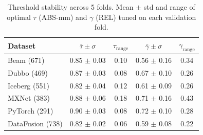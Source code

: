\begin{table}[t]
\centering
\caption{Threshold stability across 5 folds. Mean $\pm$ std and range of optimal $\tau$ (ABS-mm) and $\gamma$ (REL) tuned on each validation fold.}
\label{tab:threshold_stability}
\begin{tabular}{lcccc}
\toprule
Dataset & $\bar{\tau} \pm \sigma$ & $\tau_{\text{range}}$ & $\bar{\gamma} \pm \sigma$ & $\gamma_{\text{range}}$ \\
\midrule
  Beam (671)                & 0.85 $\pm$ 0.03 & 0.10 & 0.56 $\pm$ 0.16 & 0.34 \\
  Dubbo (469)               & 0.87 $\pm$ 0.03 & 0.08 & 0.67 $\pm$ 0.10 & 0.26 \\
  Iceberg (551)             & 0.82 $\pm$ 0.04 & 0.12 & 0.61 $\pm$ 0.09 & 0.26 \\
  MXNet (383)               & 0.88 $\pm$ 0.06 & 0.18 & 0.71 $\pm$ 0.16 & 0.43 \\
  PyTorch (291)             & 0.90 $\pm$ 0.03 & 0.08 & 0.72 $\pm$ 0.10 & 0.28 \\
  DataFusion (738)          & 0.82 $\pm$ 0.02 & 0.06 & 0.59 $\pm$ 0.08 & 0.22 \\
\bottomrule
\end{tabular}
\end{table}